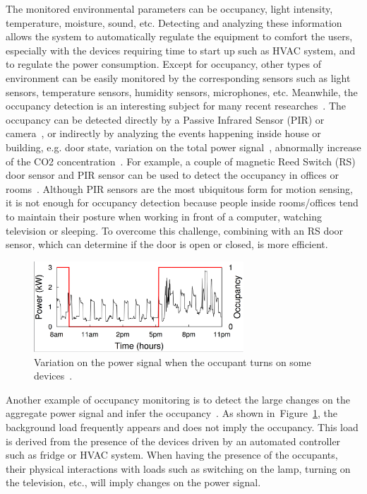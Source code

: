 The monitored environmental parameters can be occupancy, light intensity, temperature, moisture, sound, etc. Detecting and analyzing these information allows the system to automatically regulate the equipment to comfort the users, especially with the devices requiring time to start up such as HVAC system, and to regulate the power consumption. Except for occupancy, other types of environment can be easily monitored by the corresponding sensors such as light sensors, temperature sensors, humidity sensors, microphones, etc. Meanwhile, the occupancy detection is an interesting subject for many recent researches~\cite{Agarwal11ACM,Weng12DTC,Agarwal10BuildSys,Lu10ACM}. The occupancy can be detected directly by a Passive Infrared Sensor (PIR) or camera~\cite{Weng12DTC,Agarwal11ACM,Agarwal10BuildSys}, or indirectly by analyzing the events happening inside house or building, e.g. door state, variation on the total power signal~\cite{Chen13ACM}, abnormally increase of  the CO2 concentration~\cite{Wang01111999}.
For example, a couple of magnetic Reed Switch (RS) door sensor and PIR sensor can be used to detect the occupancy in offices or rooms~\cite{Agarwal11ACM,Weng12DTC}. Although PIR sensors are the most ubiquitous form for motion sensing, it is not enough for occupancy detection because people inside rooms/offices tend to maintain their posture when working in front of a computer, watching television or sleeping. To overcome this challenge, combining with an RS door sensor, which can determine if the door is open or closed, is more efficient. 
\begin{figure}
\centering
\includegraphics[width=0.7\textwidth]{./chapters/chapter1/images/nonintrusive_occupant_power.pdf} 
\caption{Variation on the power signal when the occupant turns on some devices~\cite{Chen13ACM}.} 
\label{fig:I2} 
\end{figure}
Another example of occupancy monitoring is to detect the large changes on the aggregate power signal and infer the occupancy~\cite{Chen13ACM}. As shown in~Figure~\ref{fig:I2}, the background load frequently appears and does not imply the occupancy. This load is derived from the presence of the devices driven by an automated controller such as fridge or HVAC system. When having the presence of the occupants, their physical interactions with loads such as switching on the lamp, turning on the television, etc., will imply changes on the power signal.
